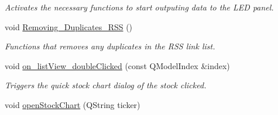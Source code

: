 \begin{DoxyCompactItemize}
\begin{DoxyCompactList}\small\item\em Activates the necessary functions to start outputing data to the L\+E\+D panel. \end{DoxyCompactList}\item 
void \hyperlink{class_t_k_r_t_a_p_a7e405d4c3d7f022889242376072ce821}{Removing\+\_\+\+Duplicates\+\_\+\+R\+S\+S} ()
\begin{DoxyCompactList}\small\item\em Functions that removes any duplicates in the R\+S\+S link list. \end{DoxyCompactList}\item 
void \hyperlink{class_t_k_r_t_a_p_a54b652ca1f240769140b278e0e4a4ddb}{on\+\_\+list\+View\+\_\+double\+Clicked} (const Q\+Model\+Index \&index)
\begin{DoxyCompactList}\small\item\em Triggers the quick stock chart dialog of the stock clicked. \end{DoxyCompactList}\item 
\hypertarget{class_t_k_r_t_a_p_a0d824d019f7724b276db0622bd43adbf}{void \hyperlink{class_t_k_r_t_a_p_a0d824d019f7724b276db0622bd43adbf}{open\+Stock\+Chart} (Q\+String ticker)}\label{class_t_k_r_t_a_p_a0d824d019f7724b276db0622bd43adbf}


\end{DoxyCompactItemize}
